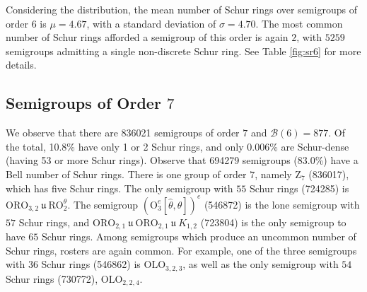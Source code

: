 \documentclass{article}
\theoremstyle{plain}
\theoremstyle{definition}
\newcommand{\B}{\mathscr{B}}
\renewcommand{\O}{\mathrm{O}}
\newcommand{\LO}{\mathrm{LO}}
\newcommand{\RO}{\mathrm{RO}}
\newcommand{\ORO}{\mathrm{ORO}}
\newcommand{\OLO}{\mathrm{OLO}}
\newcommand{\z}{\mathrm{Z}}
\renewcommand{\u}{\ \mathfrak{u}\ }
\renewcommand{\r}[1]{\ \mathfrak{r}_{#1}\ }
\begin{document}
Considering the distribution, the mean number of Schur rings over semigroups of order 6 is $\mu=4.67$, %
with a standard deviation of $\sigma=4.70$. %
The most common number of Schur rings afforded a semigroup of this order is again $2$, with $5259$ semigroups admitting a single non-discrete Schur ring. See Table \ref{fig:sr6} for more details.

\subsection{Semigroups of Order $7$}
We observe that there are 836021 semigroups of order $7$ and $\B(6)=877$. Of the total, 10.8\% have only 1 or 2 Schur rings, and only 0.006\% are Schur-dense (having 53 or more Schur rings). Observe that 694279 semigroups (83.0\%) have a Bell number of Schur rings. There is one group of order $7$, namely $\z_7$ (836017), which has five Schur rings. The only semigroup with $55$ Schur rings (724285) is $\ORO_{3,2}\u \RO_2^\theta$. The semigroup $(\O_3^e[\hat{\theta}, \theta])^e$ (546872) is the lone semigroup with $57$ Schur rings, and $\ORO_{2,1}\u\ORO_{2,1}\u K_{1,2}$ (723804) is the only semigroup to have $65$ Schur rings. Among semigroups which produce an uncommon number of Schur rings, rosters are again common. For example, one of the three semigroups with $36$ Schur rings (546862) is $\OLO_{3,2,3}$, as well as the only semigroup with $54$ Schur rings (730772), $\OLO_{2,2,4}$.
\end{document}
